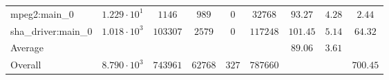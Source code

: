 \begin{tabular}{|l|c|c|c|c|c|c|c|c|}
mpeg2:main\_0           & $ 1.229 \cdot 10^{1} $ & $ 1146   $ & $ 989   $ & $ 0   $ & $ 32768  $ & $ 93.27       $ & $ 4.28    $ & $ 2.44    $ \\
sha\_driver:main\_0     & $ 1.018 \cdot 10^{3} $ & $ 103307 $ & $ 2579  $ & $ 0   $ & $ 117248 $ & $ 101.45      $ & $ 5.14    $ & $ 64.32   $ \\
\hline
Average                 & $                    $ & $        $ & $       $ & $     $ & $        $ & $ 89.06       $ & $ 3.61    $ & $         $ \\
\hline
Overall                 & $ 8.790 \cdot 10^{3} $ & $ 743961 $ & $ 62768 $ & $ 327 $ & $ 787660 $ & $             $ & $         $ & $ 700.45  $ \\
\hline
\end{tabular}
